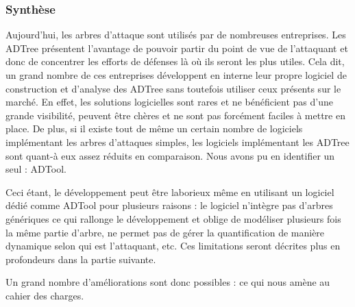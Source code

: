         \subsubsection{Synthèse}
            Aujourd'hui, les arbres d'attaque sont utilisés par de nombreuses entreprises. Les ADTree présentent l'avantage de pouvoir partir du point de vue de l'attaquant et donc de concentrer les efforts de défenses là où ils seront les plus utiles. Cela dit, un grand nombre de ces entreprises développent en interne leur propre logiciel de construction et d'analyse des ADTree sans toutefois utiliser ceux présents sur le marché. En effet, les solutions logicielles sont rares et ne bénéficient pas d'une grande visibilité, peuvent être chères et ne sont pas forcément faciles à mettre en place. De plus, si il existe tout de même un certain nombre de logiciels implémentant les arbres d'attaques simples, les logiciels implémentant les ADTree sont quant-à eux assez réduits en comparaison. Nous avons pu en identifier un seul : ADTool. 

            Ceci étant, le développement peut être laborieux même en utilisant un logiciel dédié comme ADTool pour plusieurs raisons : le logiciel n’intègre pas d'arbres génériques ce qui rallonge le développement et oblige de modéliser plusieurs fois la même partie d'arbre, ne permet pas de gérer la quantification de manière dynamique selon qui est l'attaquant, etc. Ces limitations seront décrites plus en profondeurs dans la partie suivante.

            Un grand nombre d'améliorations sont donc possibles : ce qui nous amène au cahier des charges.
